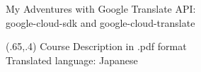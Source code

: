 \documentclass{beamer}
\begin{document}
\begin{frame}{My Adventures with Google Translate API:\\
google-cloud-sdk and google-cloud-translate}


\begin{textblock}{1}(.65,.4)
  \footnotesize  {Course Description in .pdf format \\
Translated language: Japanese}
\end{textblock}

\end{frame}
\end{document}
